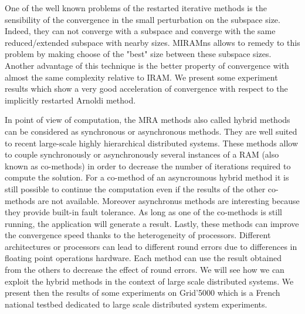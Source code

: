 \documentclass{report}
\begin{document}
One of the well known problems of the restarted iterative methods is
the sensibility of the convergence in the small perturbation on the
subspace size. Indeed, they can not converge with a subspace and
converge with the same reduced/extended subspace with nearby sizes.
MIRAMns allows to remedy to this problem by making choose of the
"best" size between these subspace sizes. Another advantage of this
technique is the better property of convergence with almost the same
complexity relative to IRAM. We present some experiment results
which show a very good acceleration of convergence with respect to
the implicitly restarted Arnoldi method.

In point of view of computation, the MRA methods also called hybrid
methods can be considered as synchronous or asynchronous methods.
They are well suited to recent large-scale highly hierarchical
distributed systems. These methods allow to couple synchronously or
asynchronously several instances of a RAM (also known as co-methods)
in order to decrease the number of iterations required to compute
the solution. For a co-method of an asyncrounous hybrid method it is
still possible to continue the computation even if the results of
the other co-methods are not available. Moreover asynchronus methods
are interesting because they provide built-in fault tolerance. As
long as one of the co-methods is still running, the application will
generate a result. Lastly, these methods can improve the convergence
speed thanks to the heterogeneity of processors. Different
architectures or processors can lead to different round errors due
to differences in floating point operations hardware. Each method
can use the result obtained from the others to decrease the effect
of round errors. We will see how we can exploit the hybrid methods
in the context of large scale distributed systems. We present then
the results of some experiments on Grid'5000 which is a French
national testbed dedicated to large scale distributed system
experiments.
\end{document}
